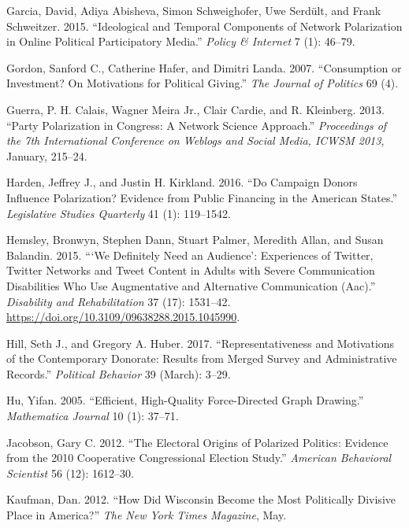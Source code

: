 \documentclass[12pt,]{article}
\begin{document}
\leavevmode\hypertarget{ref-garcia2015}{}%
Garcia, David, Adiya Abisheva, Simon Schweighofer, Uwe Serdült, and
Frank Schweitzer. 2015. ``Ideological and Temporal Components of Network
Polarization in Online Political Participatory Media.'' \emph{Policy \&
Internet} 7 (1): 46--79.

\leavevmode\hypertarget{ref-gordon2007}{}%
Gordon, Sanford C., Catherine Hafer, and Dimitri Landa. 2007.
``Consumption or Investment? On Motivations for Political Giving.''
\emph{The Journal of Politics} 69 (4).

\leavevmode\hypertarget{ref-guerra2013}{}%
Guerra, P. H. Calais, Wagner Meira Jr., Clair Cardie, and R. Kleinberg.
2013. ``Party Polarization in Congress: A Network Science Approach.''
\emph{Proceedings of the 7th International Conference on Weblogs and
Social Media, ICWSM 2013}, January, 215--24.

\leavevmode\hypertarget{ref-harden2016}{}%
Harden, Jeffrey J., and Justin H. Kirkland. 2016. ``Do Campaign Donors
Influence Polarization? Evidence from Public Financing in the American
States.'' \emph{Legislative Studies Quarterly} 41 (1): 119--1542.

\leavevmode\hypertarget{ref-hemsley2015}{}%
Hemsley, Bronwyn, Stephen Dann, Stuart Palmer, Meredith Allan, and Susan
Balandin. 2015. ```We Definitely Need an Audience': Experiences of
Twitter, Twitter Networks and Tweet Content in Adults with Severe
Communication Disabilities Who Use Augmentative and Alternative
Communication (Aac).'' \emph{Disability and Rehabilitation} 37 (17):
1531--42. \url{https://doi.org/10.3109/09638288.2015.1045990}.

\leavevmode\hypertarget{ref-hill2017}{}%
Hill, Seth J., and Gregory A. Huber. 2017. ``Representativeness and
Motivations of the Contemporary Donorate: Results from Merged Survey and
Administrative Records.'' \emph{Political Behavior} 39 (March): 3--29.

\leavevmode\hypertarget{ref-yifanhu}{}%
Hu, Yifan. 2005. ``Efficient, High-Quality Force-Directed Graph
Drawing.'' \emph{Mathematica Journal} 10 (1): 37--71.

\leavevmode\hypertarget{ref-jacobson2012}{}%
Jacobson, Gary C. 2012. ``The Electoral Origins of Polarized Politics:
Evidence from the 2010 Cooperative Congressional Election Study.''
\emph{American Behavioral Scientist} 56 (12): 1612--30.

\leavevmode\hypertarget{ref-kaufman2012}{}%
Kaufman, Dan. 2012. ``How Did Wisconsin Become the Most Politically
Divisive Place in America?'' \emph{The New York Times Magazine}, May.
\end{document}
